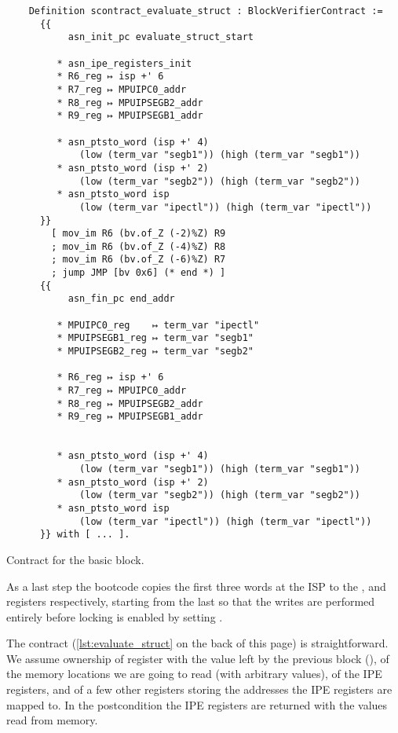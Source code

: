\begin{listing}
  \begin{verbatim}
    Definition scontract_evaluate_struct : BlockVerifierContract :=
      {{
           asn_init_pc evaluate_struct_start

         * asn_ipe_registers_init
         * R6_reg ↦ isp +' 6
         * R7_reg ↦ MPUIPC0_addr
         * R8_reg ↦ MPUIPSEGB2_addr
         * R9_reg ↦ MPUIPSEGB1_addr

         * asn_ptsto_word (isp +' 4)
             (low (term_var "segb1")) (high (term_var "segb1"))
         * asn_ptsto_word (isp +' 2)
             (low (term_var "segb2")) (high (term_var "segb2"))
         * asn_ptsto_word isp
             (low (term_var "ipectl")) (high (term_var "ipectl"))
      }}
        [ mov_im R6 (bv.of_Z (-2)%Z) R9
        ; mov_im R6 (bv.of_Z (-4)%Z) R8
        ; mov_im R6 (bv.of_Z (-6)%Z) R7
        ; jump JMP [bv 0x6] (* end *) ]
      {{
           asn_fin_pc end_addr

         * MPUIPC0_reg    ↦ term_var "ipectl"
         * MPUIPSEGB1_reg ↦ term_var "segb1"
         * MPUIPSEGB2_reg ↦ term_var "segb2"

         * R6_reg ↦ isp +' 6
         * R7_reg ↦ MPUIPC0_addr
         * R8_reg ↦ MPUIPSEGB2_addr
         * R9_reg ↦ MPUIPSEGB1_addr


         * asn_ptsto_word (isp +' 4)
             (low (term_var "segb1")) (high (term_var "segb1"))
         * asn_ptsto_word (isp +' 2)
             (low (term_var "segb2")) (high (term_var "segb2"))
         * asn_ptsto_word isp
             (low (term_var "ipectl")) (high (term_var "ipectl"))
      }} with [ ... ].
  \end{verbatim}
  \caption{Contract for the  basic block.}
  \label{lst:evaluate_struct}
\end{listing}

As a last step the bootcode copies the first three words at the ISP to the ,  and  registers respectively, starting from the last so that the writes are performed entirely before locking is enabled by setting .

The contract (\cref{lst:evaluate_struct} on the back of this page) is straightforward. We assume ownership of register  with the value left by the previous block (), of the memory locations we are going to read (with arbitrary values), of the IPE registers, and of a few other registers storing the addresses the IPE registers are mapped to. In the postcondition the IPE registers are returned with the values read from memory.

